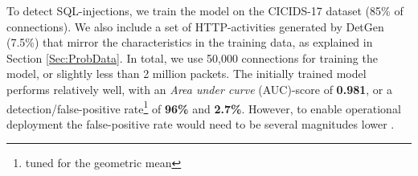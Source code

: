 \documentclass[runningheads]{llncs}
\begin{document}






To detect SQL-injections, we train the model on the CICIDS-17 dataset \cite{sharafaldin2018toward} (85\% of connections).
We also include a set of HTTP-activities generated by DetGen (7.5\%) that mirror the characteristics in the training data, as explained in Section \ref{Sec:ProbData}. %
In total, we use 50,000 connections for training the model, or slightly less than 2 million packets.
The initially trained model performs relatively well, with an \textit{Area under curve} (AUC)-score%
 of \textbf{0.981}, or a detection/false-positive rate\footnote{tuned for the geometric mean} of \textbf{96\%} and \textbf{2.7\%}. However, to enable operational deployment the false-positive rate would need to be several magnitudes lower \cite{mell2003overview}. 
\end{document}
